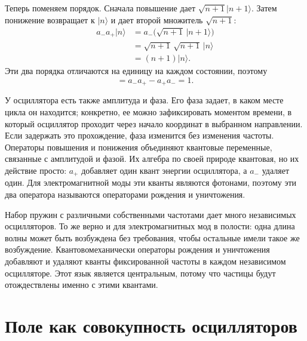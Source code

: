 Теперь поменяем порядок. Сначала повышение дает \(\sqrt{n+1}|n+1\rangle\). Затем понижение возвращает к \(|n\rangle\) и дает второй множитель \(\sqrt{n+1}\):
\begin{align}
a_-a_+|n\rangle
&=a_-\bigl(\sqrt{n+1}\,|n+1\rangle\bigr)\\
&=\sqrt{n+1}\,\sqrt{n+1}\,|n\rangle\\
&=(n+1)|n\rangle.
\end{align}
Эти два порядка отличаются на единицу на каждом состоянии, поэтому
\begin{equation}
[a_-,a_+]=a_-a_+-a_+a_-=1.
\end{equation}

У осциллятора есть также амплитуда и фаза. Его фаза задает, в каком месте цикла он находится; конкретно, ее можно зафиксировать моментом времени, в который осциллятор проходит через начало координат в выбранном направлении. Если задержать это прохождение, фаза изменится без изменения частоты. Операторы повышения и понижения объединяют квантовые переменные, связанные с амплитудой и фазой. Их алгебра по своей природе квантовая, но их действие просто: \(a_+\) добавляет один квант энергии осциллятора, а \(a_-\) удаляет один. Для электромагнитной моды эти кванты являются фотонами, поэтому эти два оператора называются операторами рождения и уничтожения.

\begin{classroomqa}
\end{classroomqa}

Набор пружин с различными собственными частотами дает много независимых осцилляторов. То же верно и для электромагнитных мод в полости: одна длина волны может быть возбуждена без требования, чтобы остальные имели такое же возбуждение. Квантовомеханически операторы рождения и уничтожения добавляют и удаляют кванты фиксированной частоты в каждом независимом осцилляторе. Этот язык является центральным, потому что частицы будут отождествлены именно с этими квантами.

\section{Поле как совокупность осцилляторов}

